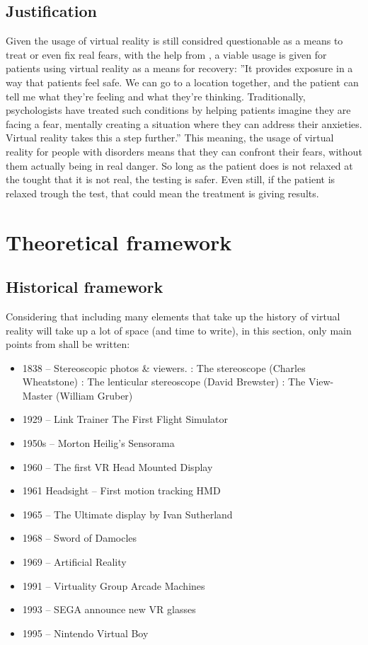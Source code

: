 \documentclass[preprint,12pt]{elsarticle}
\begin{document}
	\subsection{Justification}
	Given the usage of virtual reality is still considred questionable
	as a means to treat or even fix real fears, with the help from
	\citet{VRJustification}, a viable usage is given for patients using
	virtual reality as a means for recovery:
	\newline ''It provides exposure in a way that patients feel safe. We
	can go to a location together, and the patient can tell me what they're
	feeling and what they’re thinking. Traditionally, psychologists have
	treated such conditions by helping patients imagine they are facing a
	fear, mentally creating a situation where they can address their
	anxieties. Virtual reality takes this a step further.''
	\newline This meaning, the usage of virtual reality for people with
	disorders means that they can confront their fears, without them
	actually being in real danger. So long as the patient does is not
	relaxed at the tought that it is not real, the testing is safer. Even
	still, if the patient is relaxed trough the test, that could mean the
	treatment is giving results.
\newpage
\section{Theoretical framework}
	\subsection{Historical framework}
	Considering that including many elements that take up the history
	of virtual reality will take up a lot of space (and time to write),
	in this section, only main points from \citet{VRHistory} shall be
	written:
	\begin{itemize}
		\item 1838 – Stereoscopic photos \& viewers.
			 : The stereoscope (Charles Wheatstone)
			 : The lenticular stereoscope (David Brewster)
			 : The View-Master (William Gruber)
		\item 1929 – Link Trainer The First Flight Simulator
		\item 1950s – Morton Heilig's Sensorama
		\item 1960 – The first VR Head Mounted Display
		\item 1961 Headsight – First motion tracking HMD
		\item 1965 – The Ultimate display by Ivan Sutherland
		\item 1968 – Sword of Damocles
		\item 1969 – Artificial Reality
		\item 1991 – Virtuality Group Arcade Machines
		\item 1993 – SEGA announce new VR glasses
		\item 1995 – Nintendo Virtual Boy
	\end{itemize}
\end{document}

